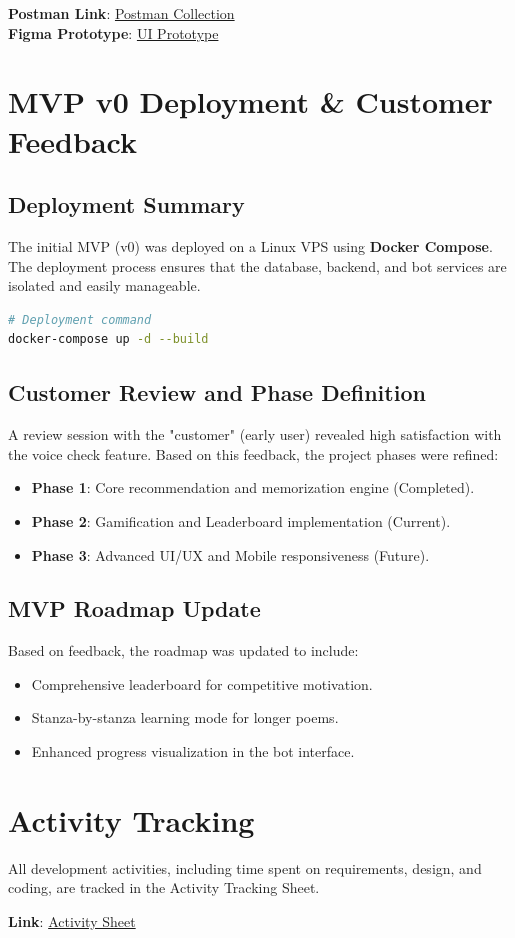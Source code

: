 \documentclass[12pt,a4paper]{article}
\begin{document}
\textbf{Postman Link}: \href{TODO: Placeholder for Postman link}{Postman Collection} \\
\textbf{Figma Prototype}: \href{TODO: Placeholder for Figma link}{UI Prototype}

\newpage
\section{MVP v0 Deployment \& Customer Feedback}

\subsection{Deployment Summary}
The initial MVP (v0) was deployed on a Linux VPS using \textbf{Docker Compose}. The deployment process ensures that the database, backend, and bot services are isolated and easily manageable.

\begin{lstlisting}[language=bash]
# Deployment command
docker-compose up -d --build
\end{lstlisting}

\subsection{Customer Review and Phase Definition}
A review session with the "customer" (early user) revealed high satisfaction with the voice check feature. Based on this feedback, the project phases were refined:
\begin{itemize}
    \item \textbf{Phase 1}: Core recommendation and memorization engine (Completed).
    \item \textbf{Phase 2}: Gamification and Leaderboard implementation (Current).
    \item \textbf{Phase 3}: Advanced UI/UX and Mobile responsiveness (Future).
\end{itemize}

\subsection{MVP Roadmap Update}
Based on feedback, the roadmap was updated to include:
\begin{itemize}
    \item Comprehensive leaderboard for competitive motivation.
    \item Stanza-by-stanza learning mode for longer poems.
    \item Enhanced progress visualization in the bot interface.
\end{itemize}

\section{Activity Tracking}
All development activities, including time spent on requirements, design, and coding, are tracked in the Activity Tracking Sheet.

\textbf{Link}: \href{TODO: Placeholder for Activity Tracking Sheet link}{Activity Sheet}
\end{document}
